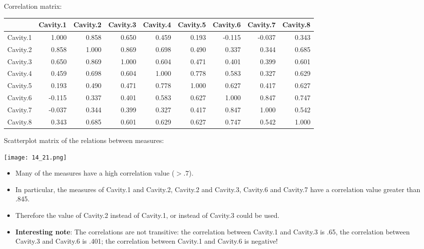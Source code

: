 \begin{frame}
Correlation matrix:\\
\vspace{.3cm}
\begin{tiny}
\begin{tabular}{l|rrrrrrrr}
         & Cavity.1 & Cavity.2 & Cavity.3 & Cavity.4 & Cavity.5 & Cavity.6 & Cavity.7 & Cavity.8\\
\hline
Cavity.1    & 1.000    & 0.858    & 0.650   & 0.459    & 0.193   & -0.115   & -0.037    & 0.343\\
Cavity.2    & 0.858    & 1.000    & 0.869    & 0.698    & 0.490    & 0.337   & 0.344    & 0.685\\
Cavity.3    & 0.650    & 0.869    & 1.000    & 0.604    & 0.471    & 0.401    & 0.399    & 0.601\\
Cavity.4    & 0.459    & 0.698    & 0.604    & 1.000    & 0.778    & 0.583    & 0.327    & 0.629\\
Cavity.5    & 0.193    & 0.490    & 0.471    & 0.778    & 1.000    & 0.627    & 0.417    & 0.627\\
Cavity.6   & -0.115    & 0.337    & 0.401    & 0.583    & 0.627    & 1.000    & 0.847    & 0.747\\
Cavity.7   & -0.037    & 0.344    & 0.399    & 0.327    & 0.417    & 0.847    & 1.000    & 0.542\\
Cavity.8    & 0.343    & 0.685    & 0.601    & 0.629    & 0.627    & 0.747    & 0.542    & 1.000\\
\end{tabular} 
\end{tiny}
\end{frame}

\begin{frame}
Scatterplot matrix of the relations between measures:
\vspace{.3cm}
	\begin{center}
		\texttt{[image: 14\_21.png]}
	\end{center}
\end{frame}

\begin{frame}
\begin{itemize}
 \item Many of the measures have a high correlation value ($>.7$).
 \item In particular, the measures of Cavity.1 and Cavity.2, Cavity.2 and Cavity.3, Cavity.6 and Cavity.7 have a correlation value greater than .845. 
 \item Therefore the value of Cavity.2 instead of Cavity.1, or instead of Cavity.3 could be used.
 \item \textbf{Interesting note}: The correlations are not transitive: the correlation between Cavity.1 and Cavity.3 is .65, the correlation between Cavity.3 and Cavity.6 is .401; the correlation between Cavity.1 and Cavity.6 is negative! 
 \end{itemize}

\end{frame}


